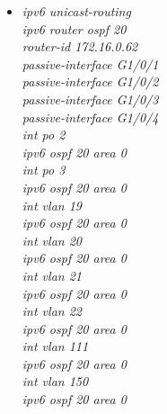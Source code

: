 \documentclass[12pt,a4paper]{report}
\begin{document}
\begin{itemize}
\begin{itemize}
        \begin{itemize}
         \item \textit{ipv6 unicast-routing\\
ipv6 router ospf 20\\
router-id 172.16.0.62\\
passive-interface G1/0/1\\
passive-interface G1/0/2\\
passive-interface G1/0/3\\
passive-interface G1/0/4\\
int po 2\\
ipv6 ospf 20 area 0\\
int po 3\\
ipv6 ospf 20 area 0\\
int vlan 19\\
ipv6 ospf 20 area 0\\
int vlan 20\\
ipv6 ospf 20 area 0\\
int vlan 21\\
ipv6 ospf 20 area 0\\
int vlan 22\\
ipv6 ospf 20 area 0\\
int vlan 111\\
ipv6 ospf 20 area 0\\
int vlan 150\\
ipv6 ospf 20 area 0\\}
        
          \end{itemize}
       \end{itemize}
      
\end{itemize}
\end{document}

